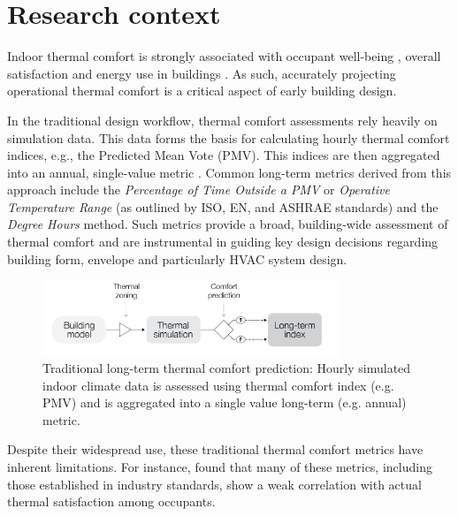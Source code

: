 
\section{Research context}

Indoor thermal comfort is strongly associated with occupant well-being \citep{altomonte_ten_2020}, overall satisfaction \citep{graham_lessons_2021} and energy use in buildings \citep{yang_thermal_2014}. As such, accurately projecting operational thermal comfort is a critical aspect of early building design.

In the traditional design workflow, thermal comfort assessments rely heavily on simulation data. This data forms the basis for calculating hourly thermal comfort indices, e.g., the Predicted Mean Vote (PMV). This indices are then aggregated into an annual, single-value metric . Common long-term metrics derived from this approach include the \textit{Percentage of Time Outside a PMV} or \textit{Operative Temperature Range} (as outlined by ISO, EN, and ASHRAE standards) and the \textit{Degree Hours} method. Such metrics provide a broad, building-wide assessment of thermal comfort and are instrumental in guiding key design decisions regarding building form, envelope and particularly HVAC system design.

\begin{figure}[h!]
    \centering
    \includegraphics[width=8.9cm]{manuscript/src/figures/conventional-workflow.png}
    \caption{Traditional long-term thermal comfort prediction: Hourly simulated indoor climate data is assessed using thermal comfort index (e.g. PMV) and is aggregated into a single value long-term (e.g. annual) metric. }
    \label{fig:typical-workflow}
\end{figure}

Despite their widespread use, these traditional thermal comfort metrics have inherent limitations. For instance, \citet{li_improved_2020} found that many of these metrics, including those established in industry standards, show a weak correlation with actual thermal satisfaction among occupants.

